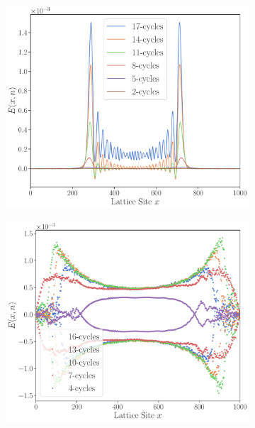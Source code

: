 \documentclass[11pt, a4paper]{article}
\theoremstyle{definition} %
\begin{document}
	\begin{figure}[h]
		\begin{subfigure}[c]{0.45\textwidth}
			\includegraphics[width=\textwidth]{Energy_Density1}
		\end{subfigure}
		\begin{subfigure}[c]{0.45\textwidth}
			\includegraphics[width=\textwidth]{Energy_Density2}
		\end{subfigure}
		\caption{}
	\end{figure}
	
	
	
\end{document}
